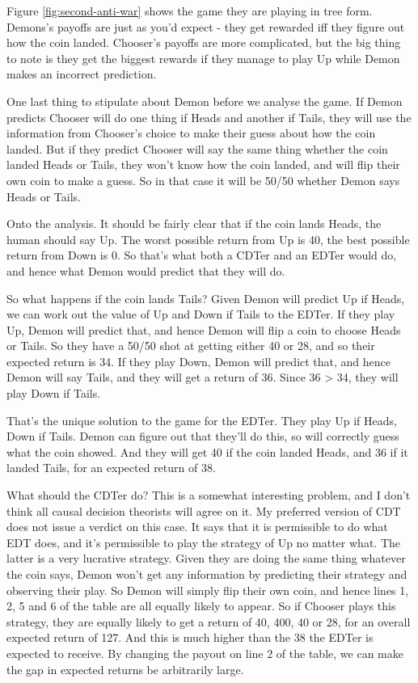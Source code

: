 \documentclass[
  12pt,
]{article}
\begin{document}
Figure \ref{fig:second-anti-war} shows the game they are playing in tree form. Demons's payoffs are just as you'd expect - they get rewarded iff they figure out how the coin landed. Chooser's payoffs are more complicated, but the big thing to note is they get the biggest rewards if they manage to play Up while Demon makes an incorrect prediction.

One last thing to stipulate about Demon before we analyse the game. If Demon predicts Chooser will do one thing if Heads and another if Tails, they will use the information from Chooser's choice to make their guess about how the coin landed. But if they predict Chooser will say the same thing whether the coin landed Heads or Tails, they won't know how the coin landed, and will flip their own coin to make a guess. So in that case it will be 50/50 whether Demon says Heads or Tails.

Onto the analysis. It should be fairly clear that if the coin lands Heads, the human should say Up. The worst possible return from Up is 40, the best possible return from Down is 0. So that's what both a CDTer and an EDTer would do, and hence what Demon would predict that they will do.

So what happens if the coin lands Tails? Given Demon will predict Up if Heads, we can work out the value of Up and Down if Tails to the EDTer. If they play Up, Demon will predict that, and hence Demon will flip a coin to choose Heads or Tails. So they have a 50/50 shot at getting either 40 or 28, and so their expected return is 34. If they play Down, Demon will predict that, and hence Demon will say Tails, and they will get a return of 36. Since 36 \textgreater{} 34, they will play Down if Tails.

That's the unique solution to the game for the EDTer. They play Up if Heads, Down if Tails. Demon can figure out that they'll do this, so will correctly guess what the coin showed. And they will get 40 if the coin landed Heads, and 36 if it landed Tails, for an expected return of 38.

What should the CDTer do? This is a somewhat interesting problem, and I don't think all causal decision theorists will agree on it. My preferred version of CDT does not issue a verdict on this case. It says that it is permissible to do what EDT does, and it's permissible to play the strategy of Up no matter what. The latter is a very lucrative strategy. Given they are doing the same thing whatever the coin says, Demon won't get any information by predicting their strategy and observing their play. So Demon will simply flip their own coin, and hence lines 1, 2, 5 and 6 of the table are all equally likely to appear. So if Chooser plays this strategy, they are equally likely to get a return of 40, 400, 40 or 28, for an overall expected return of 127. And this is much higher than the 38 the EDTer is expected to receive. By changing the payout on line 2 of the table, we can make the gap in expected returns be arbitrarily large.
\end{document}
